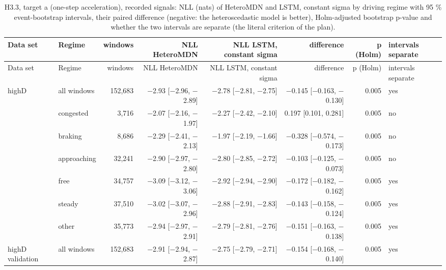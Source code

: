 \begingroup
\footnotesize
\begin{longtable}{llrrrrrl}
\caption{H3.3, target a (one-step acceleration), recorded signals: NLL (nats) of HeteroMDN and LSTM, constant sigma by driving regime with 95 \% event-bootstrap intervals, their paired difference (negative: the heteroscedastic model is better), Holm-adjusted bootstrap p-value and whether the two intervals are separate (the literal criterion of the plan).}\label{tab:t3-h33-nll--raw--a} \\
\toprule
Data set & Regime & windows & NLL HeteroMDN & NLL LSTM, constant sigma & difference & p (Holm) & intervals separate \\
\midrule
\endfirsthead
\toprule
Data set & Regime & windows & NLL HeteroMDN & NLL LSTM, constant sigma & difference & p (Holm) & intervals separate \\
\midrule
\endhead
\bottomrule
\endlastfoot
highD & all windows & 152,683 & $-$2.93 [$-$2.96, $-$2.89] & $-$2.78 [$-$2.81, $-$2.75] & $-$0.145 [$-$0.163, $-$0.130] & 0.005 & yes \\
 & congested & 3,716 & $-$2.07 [$-$2.16, $-$1.97] & $-$2.27 [$-$2.42, $-$2.10] & 0.197 [0.101, 0.281] & 0.005 & no \\
 & braking & 8,686 & $-$2.29 [$-$2.41, $-$2.13] & $-$1.97 [$-$2.19, $-$1.66] & $-$0.328 [$-$0.574, $-$0.173] & 0.005 & no \\
 & approaching & 32,241 & $-$2.90 [$-$2.97, $-$2.80] & $-$2.80 [$-$2.85, $-$2.72] & $-$0.103 [$-$0.125, $-$0.073] & 0.005 & no \\
 & free & 34,757 & $-$3.09 [$-$3.12, $-$3.06] & $-$2.92 [$-$2.94, $-$2.90] & $-$0.172 [$-$0.182, $-$0.162] & 0.005 & yes \\
 & steady & 37,510 & $-$3.02 [$-$3.07, $-$2.96] & $-$2.88 [$-$2.91, $-$2.83] & $-$0.143 [$-$0.158, $-$0.124] & 0.005 & yes \\
 & other & 35,773 & $-$2.94 [$-$2.97, $-$2.91] & $-$2.79 [$-$2.81, $-$2.76] & $-$0.151 [$-$0.163, $-$0.138] & 0.005 & yes \\
\midrule
highD validation & all windows & 152,683 & $-$2.91 [$-$2.94, $-$2.87] & $-$2.75 [$-$2.79, $-$2.71] & $-$0.154 [$-$0.168, $-$0.140] & 0.005 & yes \\

\end{longtable}

